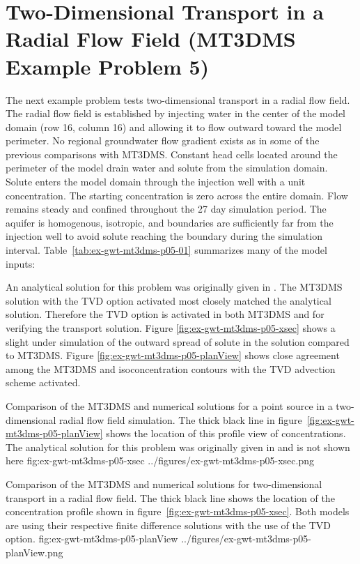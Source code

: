 \section{Two-Dimensional Transport in a Radial Flow Field (MT3DMS Example Problem 5)}

The next example problem tests two-dimensional transport in a radial flow field.  The radial flow field is established by injecting water in the center of the model domain (row 16, column 16) and allowing it to flow outward toward the model perimeter. No regional groundwater flow gradient exists as in some of the previous comparisons with MT3DMS. Constant head cells located around the perimeter of the model drain water and solute from the simulation domain. Solute enters the model domain through the injection well with a unit concentration.  The starting concentration is zero across the entire domain. Flow remains steady and confined throughout the 27 day simulation period. The aquifer is homogenous, isotropic, and boundaries are sufficiently far from the injection well to avoid solute reaching the boundary during the simulation interval. Table~\ref{tab:ex-gwt-mt3dms-p05-01} summarizes many of the model inputs:



An analytical solution for this problem was originally given in \cite{moench1981}. The MT3DMS solution with the TVD option activated most closely matched the analytical solution.  Therefore the TVD option is activated in both MT3DMS and \mf for verifying the transport solution. Figure \ref{fig:ex-gwt-mt3dms-p05-xsec} shows a slight under simulation of the outward spread of solute in the \mf solution compared to MT3DMS. Figure \ref{fig:ex-gwt-mt3dms-p05-planView} shows close agreement among the MT3DMS and \mf isoconcentration contours with the TVD advection scheme activated. 

\begin{StandardFigure}
	{Comparison of the MT3DMS and \mf numerical solutions for a point source in a two-dimensional radial flow field simulation.  The thick black line in figure~\ref{fig:ex-gwt-mt3dms-p05-planView} shows the location of this profile view of concentrations.  The analytical solution for this problem was originally given in \citep{moench1981} and is not shown here} 
	{fig:ex-gwt-mt3dms-p05-xsec}
	{../figures/ex-gwt-mt3dms-p05-xsec.png}
\end{StandardFigure}

\begin{StandardFigure}
	{Comparison of the MT3DMS and \mf numerical solutions for two-dimensional transport in a radial flow field.  The thick black line shows the location of the concentration profile shown in figure~\ref{fig:ex-gwt-mt3dms-p05-xsec}. Both models are using their respective finite difference solutions with the use of the TVD option.} 
	{fig:ex-gwt-mt3dms-p05-planView}
	{../figures/ex-gwt-mt3dms-p05-planView.png}
\end{StandardFigure}
